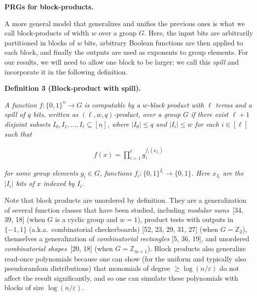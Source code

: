 \par\medskip\noindent\textbf{PRGs for block-products.}\par




A more general model that generalizes and unifies the previous ones
is what we call block-products of width $w$ over a group $G$. Here,
the input bits are arbitrarily partitioned in blocks of $w$ bits,
arbitrary Boolean functions are then applied to each
block, and finally the outputs are used as exponents to group elements. For our results, we will need to allow one block to be
larger; we call this \emph{spill} and incorporate it in the following
definition.\par





\par\medskip\noindent\textbf{
\textbf{Definition 3}\textbf{ }(Block-product with spill)\textbf{.}
}\par



\emph{A function $f\colon\{0,1\}^{n}\to G$ is computable by a $w$-block product
with $\ell$ terms and a spill of $q$ bits, written as $(\ell,w,q)$-product,
over a group $G$ if there exist $\ell+1$
disjoint subsets $I_{0},I_{1},\ldots,I_{\ell}\subseteq[n]$, where $\lvert I_{0}\rvert\leq q$ and
$\lvert I_{i}\rvert\leq w$ for each $i\in[\ell]$ such that}\par


\[\begin{gathered}
f(x)=\prod_{i=1}^{\ell}g_{i}^{f_{i}(x_{I_{i}})}
\end{gathered}\]


\emph{for some group elements $g_{i}\in G$, functions $f_{i}\colon\{0,1\}^{I_{i}}\to\{0,1\}$.
Here $x_{I_{i}}$ are the $|I_{i}|$ bits of $x$ indexed by $I_{i}$.}\par






Note that block products are unordered by definition. They are a generalization
of several function classes that have been studied, including \emph{modular
sums} [34, 39, 18] (when $G$ is a cyclic group and
$w=1$), product tests with outputs in $\{-1,1\}$ (a.k.a. combinatorial
checkerboards) [52, 23, 29, 31, 27] (when $G=\mathbb{Z}_{2}$),
themselves a generalization of \emph{combinatorial rectangles }[5, 36, 19],
and unordered \emph{combinatorial shapes} [20, 18] (when
$G=\mathbb{Z}_{m+1}$). Block products also generalize read-once polynomials
because one can show (for the uniform and typically also pseudorandom
distributions) that monomials of degree $\geq\log(n/\varepsilon)$ do not affect
the result significantly, and so one can simulate these polynomials
with blocks of size $\log(n/\varepsilon)$.\par




